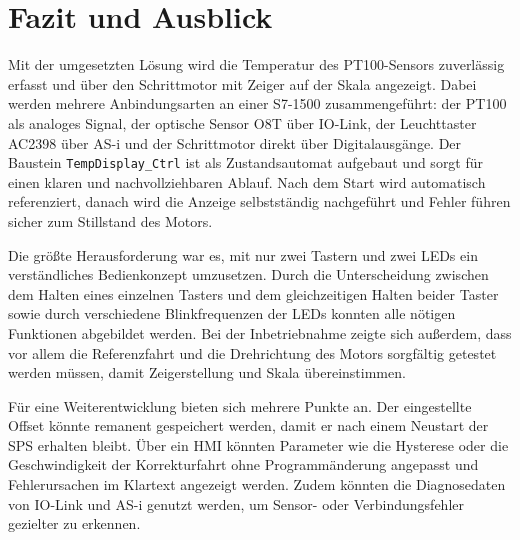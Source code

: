 \section{Fazit und Ausblick}
Mit der umgesetzten Lösung wird die Temperatur des PT100-Sensors zuverlässig erfasst und über den Schrittmotor mit Zeiger auf der Skala angezeigt. 
Dabei werden mehrere Anbindungsarten an einer S7-1500 zusammengeführt: der PT100 als analoges Signal, der optische Sensor O8T über IO-Link, der Leuchttaster AC2398 über AS-i und der Schrittmotor direkt über Digitalausgänge. 
Der Baustein \texttt{TempDisplay\_Ctrl} ist als Zustandsautomat aufgebaut und sorgt für einen klaren und nachvollziehbaren Ablauf. Nach dem Start wird automatisch referenziert, danach wird die Anzeige selbstständig nachgeführt und Fehler führen sicher zum Stillstand des Motors.

Die größte Herausforderung war es, mit nur zwei Tastern und zwei LEDs ein verständliches Bedienkonzept umzusetzen. 
Durch die Unterscheidung zwischen dem Halten eines einzelnen Tasters und dem gleichzeitigen Halten beider Taster sowie durch verschiedene Blinkfrequenzen der LEDs konnten alle nötigen Funktionen abgebildet werden. 
Bei der Inbetriebnahme zeigte sich außerdem, dass vor allem die Referenzfahrt und die Drehrichtung des Motors sorgfältig getestet werden müssen, damit Zeigerstellung und Skala übereinstimmen.

Für eine Weiterentwicklung bieten sich mehrere Punkte an. 
Der eingestellte Offset könnte remanent gespeichert werden, damit er nach einem Neustart der SPS erhalten bleibt. 
Über ein HMI könnten Parameter wie die Hysterese oder die Geschwindigkeit der Korrekturfahrt ohne Programmänderung angepasst und Fehlerursachen im Klartext angezeigt werden. 
Zudem könnten die Diagnosedaten von IO-Link und AS-i genutzt werden, um Sensor- oder Verbindungsfehler gezielter zu erkennen.
